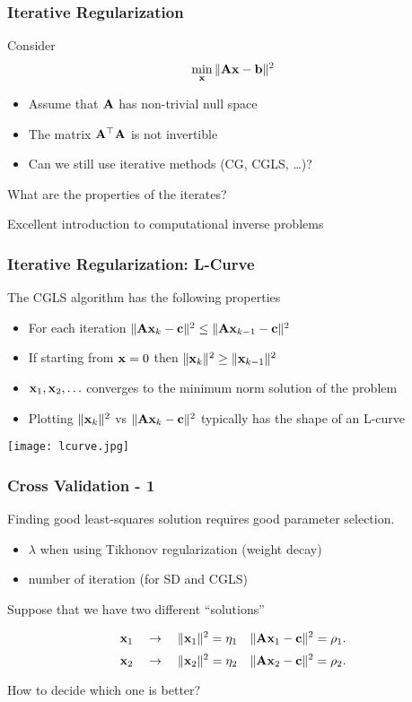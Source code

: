 \documentclass[12pt,fleqn]{beamer}
\begin{document}
\begin{frame}
	\frametitle{Iterative Regularization}

Consider
$$
	\min_{\bf x} \| {\bf A} {\bf x} - {\bf b} \|^2
$$
\begin{itemize}
\item
Assume that ${\bf A}$ has non-trivial null space
\item The matrix ${\bf A}^{\top}{\bf A}$ is not invertible
\item Can we still use iterative methods (CG, CGLS, \ldots)?
\end{itemize}

\bigskip

What are the properties of the iterates? 

\bigskip

Excellent introduction to computational inverse problems~\cite{Hansen1998,Vogel2002,Hansen2010}

\end{frame}




\begin{frame}
	\frametitle{Iterative Regularization: L-Curve}


The CGLS algorithm has the following properties
\begin{itemize}
\item For each iteration $\| {\bf A} {\bf x}_k -{\bf c} \|^2 \le \| {\bf A} {\bf x}_{k-1} -{\bf c} \|^2$
\item If starting from  ${\bf x}=0$ then $\|{\bf x}_k  \|^2 \ge \|  {\bf x}_{k-1}  \|^2$

\item ${\bf x}_1,{\bf x}_2,\ldots$ converges to the minimum norm solution of the problem
\item Plotting $\|{\bf x}_k\|^2$ vs $\| {\bf A}{\bf x}_k -{\bf c} \|^2$ typically has the shape of an L-curve
\end{itemize}



\begin{center}
\texttt{[image: lcurve.jpg]}
\end{center}
\end{frame}


\begin{frame}
	\frametitle{Cross Validation - 1}

Finding good least-squares solution requires good parameter selection.
\begin{itemize}
\item $\lambda$ when using Tikhonov regularization (weight decay)
\item number of iteration (for SD and CGLS)
\end{itemize}

\bigskip

Suppose that we have two different ``solutions''

$${\bf x}_1\quad  \rightarrow \quad  \|{\bf x}_1\|^2 = \eta_1 \quad \|{\bf A} {\bf x}_1 - {\bf c}\|^2 = \rho_1. $$
$${\bf x}_2\quad  \rightarrow \quad  \|{\bf x}_2\|^2 = \eta_2 \quad \|{\bf A} {\bf x}_2 - {\bf c}\|^2 = \rho_2. $$

How to decide which one is better?

\end{frame}
\end{document}
